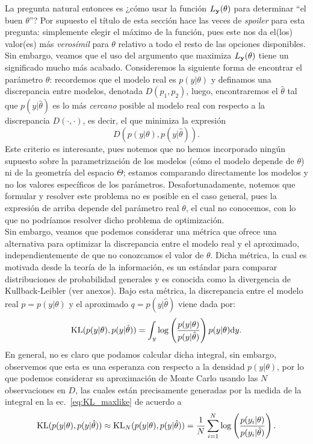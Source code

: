 La pregunta  natural entonces es ¿cómo usar la función $L_{\mathbf{y}}(\theta)$ para determinar ``el buen $\theta$''? Por supuesto el título de esta sección hace las veces de \emph{spoiler} para esta pregunta: simplemente elegir el máximo de la función, pues este nos da el(los) valor(es) más \emph{verosímil} para $\theta$ relativo a todo el resto de las opciones disponibles. Sin embargo, veamos que el uso del argumento que maximiza $L_{\mathbf{y}}(\theta)$ tiene un significado  mucho más  acabado. Consideremos la siguiente forma de encontrar el parámetro $\theta$: recordemos que el  modelo real es $p(y|\theta)$ y definamos una discrepancia entre modelos, denotada $D(p_1,p_2)$, luego, encontraremos el $\hat\theta$ tal que $p(y|\hat\theta)$ es lo más \emph{cercano} posible al modelo real con respecto a la discrepancia $D(\cdot,\cdot)$, es decir, el que minimiza la expresión
\begin{equation}
    	D(p(y|\theta),p(y|\hat\theta)).
\end{equation}  
Este criterio es interesante, pues notemos que no hemos incorporado ningún supuesto sobre la parametrización de  los  modelos (cómo el  modelo depende de $\theta$) ni de la  geometría del espacio  $\Theta$; estamos comparando directamente los modelos y no los  valores específicos de los parámetros. Desafortunadamente, notemos que formular y resolver  este problema no es posible en el caso general, pues la expresión de arriba depende del parámetro real $\theta$, el cual no conocemos, con lo que no podríamos resolver dicho problema de optimización.\\ 

Sin embargo, veamos que podemos considerar una métrica que ofrece una alternativa para optimizar la discrepancia entre el modelo real y el aproximado, independientemente de que no conozcamos el valor de $\theta$. Dicha métrica, la cual es motivada desde la teoría de la información, es un estándar para comparar distribuciones de probabilidad generales y es conocida como la divergencia de Kullback-Leibler (ver anexos). Bajo esta métrica, la discrepancia entre el modelo real $p =  p(y|\theta)$ y el aproximado $q  = p(y|\hat\theta)$ viene dada por:
\begin{equation}
 	\operatorname{\text{KL}}( p(y|\theta),p(y|\hat\theta)) =  \int_y\log\left(\frac{p(y|\theta)}{p(y|\hat\theta)}\right)p(y|\theta){\text d} y.\label{eq:KL_maxlike}
 \end{equation} 
 En general, no es claro que podamos calcular dicha integral, sin embargo, observemos que esta es una  esperanza con respecto a la densidad $p(y|\theta)$, por lo que podemos considerar su aproximación de Monte Carlo usando las $N$ observaciones en $D$, las cuales están precisamente generadas por la medida de la integral en la ec.~\eqref{eq:KL_maxlike} de acuerdo a 
\begin{equation}
	\operatorname{\text{KL}}( p(y|\theta),p(y|\hat\theta)) 	\approx \operatorname{\text{KL}}_N( p(y|\theta),p(y|\hat\theta)) = \frac{1}{N}\sum_{i=1}^N\log\left(\frac{p(y_i|\theta)}{p(y_i|\hat\theta)}\right).
\end{equation}

